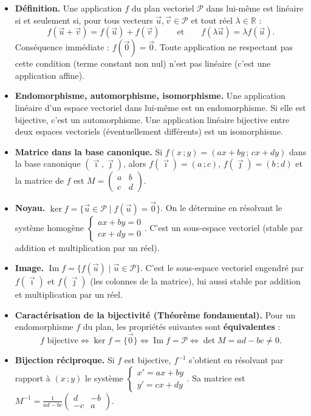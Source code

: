 \documentclass[11pt]{article}
\newcommand{\cle}[1]{{\popxbold\color{popdark}#1}}
\begin{document}
\begin{aretenir}
\begin{itemize}
\item \textbf{Définition.} Une application $f$ du plan vectoriel $\mathcal{P}$ dans lui-même est \cle{linéaire} si et seulement si, pour tous vecteurs $\vec{u}, \vec{v} \in \mathcal{P}$ et tout réel $\lambda \in \mathbb{R}$ :
\[ f(\vec{u}+\vec{v}) = f(\vec{u}) + f(\vec{v}) \qquad \text{et} \qquad f(\lambda\vec{u}) = \lambda f(\vec{u}). \]
Conséquence immédiate : $f(\vec{0}) = \vec{0}$. Toute application ne respectant pas cette condition (terme constant non nul) n'est pas linéaire (c'est une application affine).
\item \textbf{Endomorphisme, automorphisme, isomorphisme.} Une application linéaire d'un espace vectoriel dans lui-même est un \cle{endomorphisme}. Si elle est bijective, c'est un \cle{automorphisme}. Une application linéaire bijective entre deux espaces vectoriels (éventuellement différents) est un \cle{isomorphisme}.
\item \textbf{Matrice dans la base canonique.} Si $f(x\,;y) = (ax+by\,;\,cx+dy)$ dans la base canonique $(\vec{\imath},\vec{\jmath})$, alors $f(\vec{\imath}) = (a\,;c)$, $f(\vec{\jmath}) = (b\,;d)$ et la matrice de $f$ est $M = \begin{pmatrix} a & b \\ c & d \end{pmatrix}$.
\item \textbf{Noyau.} $\ker f = \{\vec{u} \in \mathcal{P} \mid f(\vec{u}) = \vec{0}\}$. On le détermine en résolvant le système homogène $\begin{cases} ax+by = 0 \\ cx+dy = 0 \end{cases}$. C'est un sous-espace vectoriel (stable par addition et multiplication par un réel).
\item \textbf{Image.} $\operatorname{Im} f = \{f(\vec{u}) \mid \vec{u} \in \mathcal{P}\}$. C'est le sous-espace vectoriel engendré par $f(\vec{\imath})$ et $f(\vec{\jmath})$ (les colonnes de la matrice), lui aussi stable par addition et multiplication par un réel.
\item \textbf{Caractérisation de la bijectivité (Théorème fondamental).} Pour un endomorphisme $f$ du plan, les propriétés suivantes sont \textbf{équivalentes} :
\[ f \text{ bijective} \iff \ker f = \{\vec{0}\} \iff \operatorname{Im} f = \mathcal{P} \iff \det M = ad - bc \neq 0. \]
\item \textbf{Bijection réciproque.} Si $f$ est bijective, $f^{-1}$ s'obtient en résolvant par rapport à $(x\,;y)$ le système $\begin{cases} x' = ax+by \\ y' = cx+dy \end{cases}$. Sa matrice est $M^{-1} = \frac{1}{ad-bc}\begin{pmatrix} d & -b \\ -c & a \end{pmatrix}$.

\end{itemize}
\end{aretenir}
\end{document}
